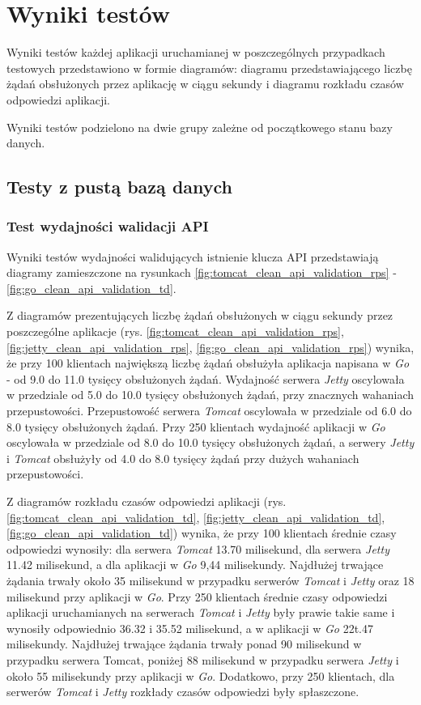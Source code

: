\chapter{Wyniki testów}
Wyniki testów każdej aplikacji uruchamianej w poszczególnych przypadkach  testowych przedstawiono w formie diagramów: diagramu przedstawiającego liczbę żądań obsłużonych przez aplikację w ciągu sekundy i diagramu rozkładu czasów odpowiedzi aplikacji.

Wyniki testów podzielono na dwie grupy zależne  od początkowego stanu bazy danych.

\section{Testy z pustą bazą danych}

\subsection{Test wydajności walidacji API}
Wyniki testów wydajności walidujących istnienie klucza API przedstawiają diagramy zamieszczone na rysunkach \ref{fig:tomcat_clean_api_validation_rps} - \ref{fig:go_clean_api_validation_td}.

Z diagramów prezentujących liczbę żądań obsłużonych w ciągu sekundy przez poszczególne aplikacje (rys. \ref{fig:tomcat_clean_api_validation_rps}, \ref{fig:jetty_clean_api_validation_rps}, \ref{fig:go_clean_api_validation_rps}) wynika, że przy 100 klientach największą liczbę żądań obsłużyła aplikacja napisana w \textsl{Go} - od 9.0 do 11.0 tysięcy obsłużonych żądań. Wydajność serwera \textsl{Jetty} oscylowała w przedziale od 5.0 do 10.0 tysięcy obsłużonych żądań, przy znacznych wahaniach przepustowości. Przepustowość serwera \textsl{Tomcat} oscylowała w przedziale od 6.0 do 8.0 tysięcy obsłużonych żądań. Przy 250 klientach wydajność aplikacji w \textsl{Go} oscylowała w przedziale od 8.0 do 10.0 tysięcy obsłużonych żądań, a serwery \textsl{Jetty} i \textsl{Tomcat} obsłużyły od 4.0 do 8.0 tysięcy żądań przy dużych wahaniach przepustowości.      

Z diagramów rozkładu czasów odpowiedzi aplikacji (rys. \ref{fig:tomcat_clean_api_validation_td}, \ref{fig:jetty_clean_api_validation_td}, \ref{fig:go_clean_api_validation_td}) wynika, że przy 100 klientach średnie czasy odpowiedzi wynosiły: dla serwera \textsl{Tomcat} 13.70 milisekund, dla serwera \textsl{Jetty} 11.42 milisekund, a dla aplikacji w \textsl{Go} 9,44 milisekundy. Najdłużej trwające żądania trwały około 35 milisekund w przypadku serwerów \textsl{Tomcat} i \textsl{Jetty} oraz 18 milisekund przy aplikacji w \textsl{Go}. Przy 250 klientach średnie czasy odpowiedzi aplikacji uruchamianych na serwerach \textsl{Tomcat} i \textsl{Jetty} były prawie takie same i wynosiły odpowiednio 36.32 i 35.52 milisekund, a w aplikacji w \textsl{Go} 22t.47 milisekundy. Najdłużej trwające żądania trwały ponad 90 milisekund w przypadku serwera Tomcat, poniżej 88 milisekund w przypadku serwera \textsl{Jetty} i około 55 milisekundy przy aplikacji w \textsl{Go}. Dodatkowo, przy 250 klientach, dla serwerów \textsl{Tomcat} i \textsl{Jetty} rozkłady czasów odpowiedzi były spłaszczone. 

